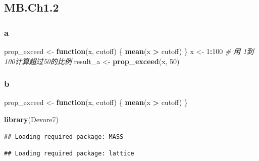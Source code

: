 \documentclass[
]{article}
\newenvironment{Shaded}{\begin{snugshade}}{\end{snugshade}}
\newcommand{\AttributeTok}[1]{\textcolor[rgb]{0.13,0.29,0.53}{#1}}
\newcommand{\CommentTok}[1]{\textcolor[rgb]{0.56,0.35,0.01}{\textit{#1}}}
\newcommand{\ControlFlowTok}[1]{\textcolor[rgb]{0.13,0.29,0.53}{\textbf{#1}}}
\newcommand{\DecValTok}[1]{\textcolor[rgb]{0.00,0.00,0.81}{#1}}
\newcommand{\FloatTok}[1]{\textcolor[rgb]{0.00,0.00,0.81}{#1}}
\newcommand{\FunctionTok}[1]{\textcolor[rgb]{0.13,0.29,0.53}{\textbf{#1}}}
\newcommand{\NormalTok}[1]{#1}
\newcommand{\OtherTok}[1]{\textcolor[rgb]{0.56,0.35,0.01}{#1}}
\newcommand{\SpecialCharTok}[1]{\textcolor[rgb]{0.81,0.36,0.00}{\textbf{#1}}}
\newcommand{\StringTok}[1]{\textcolor[rgb]{0.31,0.60,0.02}{#1}}
\begin{document}
\subsection{MB.Ch1.2}\label{mb.ch1.2}

\subsubsection{a}\label{a-3}

\begin{Shaded}
\begin{Highlighting}[]
\NormalTok{prop\_exceed }\OtherTok{\textless{}{-}} \ControlFlowTok{function}\NormalTok{(x, cutoff) \{}
  \FunctionTok{mean}\NormalTok{(x }\SpecialCharTok{\textgreater{}}\NormalTok{ cutoff)}
\NormalTok{\}}
\NormalTok{x }\OtherTok{\textless{}{-}} \DecValTok{1}\SpecialCharTok{:}\DecValTok{100}
\CommentTok{\# 用 1到100计算超过50的比例}
\NormalTok{result\_a }\OtherTok{\textless{}{-}} \FunctionTok{prop\_exceed}\NormalTok{(x, }\DecValTok{50}\NormalTok{)}
\end{Highlighting}
\end{Shaded}

\subsubsection{b}\label{b-4}

\begin{Shaded}
\begin{Highlighting}[]
\NormalTok{prop\_exceed }\OtherTok{\textless{}{-}} \ControlFlowTok{function}\NormalTok{(x, cutoff) \{}
  \FunctionTok{mean}\NormalTok{(x }\SpecialCharTok{\textgreater{}}\NormalTok{ cutoff)}
\NormalTok{\}}

\FunctionTok{library}\NormalTok{(Devore7)}
\end{Highlighting}
\end{Shaded}

\begin{verbatim}
## Loading required package: MASS
\end{verbatim}

\begin{verbatim}
## Loading required package: lattice
\end{verbatim}

\begin{Shaded}
\end{Shaded}
\end{document}
